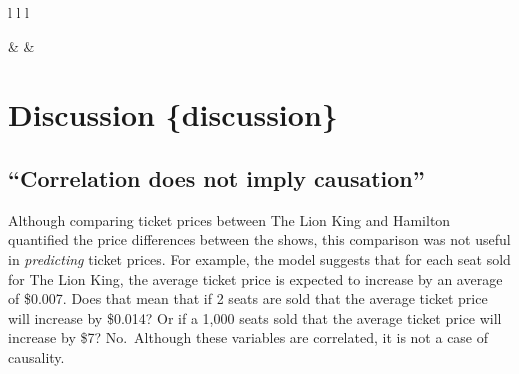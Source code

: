 \documentclass[
]{article}
\begin{document}
\begin{table}[ht]
\begin{centerbox}
\begin{threeparttable}
\begin{tabular}{l l l}
\hhline{}

 &
 &
 \tabularnewline[-0.5pt]



 \tabularnewline[-0.5pt]


\hhline{}
\end{tabular}
\end{threeparttable}\par\end{centerbox}

\end{table}
 

\newpage

\hypertarget{discussion-discussion}{%
\section{Discussion \{discussion\}}\label{discussion-discussion}}

\hypertarget{correlation-does-not-imply-causation}{%
\subsection{``Correlation does not imply causation''}\label{correlation-does-not-imply-causation}}

Although comparing ticket prices between The Lion King and Hamilton quantified the price differences between the shows, this comparison was not useful in \emph{predicting} ticket prices. For example, the model suggests that for each seat sold for The Lion King, the average ticket price is expected to increase by an average of \$0.007. Does that mean that if 2 seats are sold that the average ticket price will increase by \$0.014? Or if a 1,000 seats sold that the average ticket price will increase by \$7? No.~Although these variables are correlated, it is not a case of causality.
\end{document}
